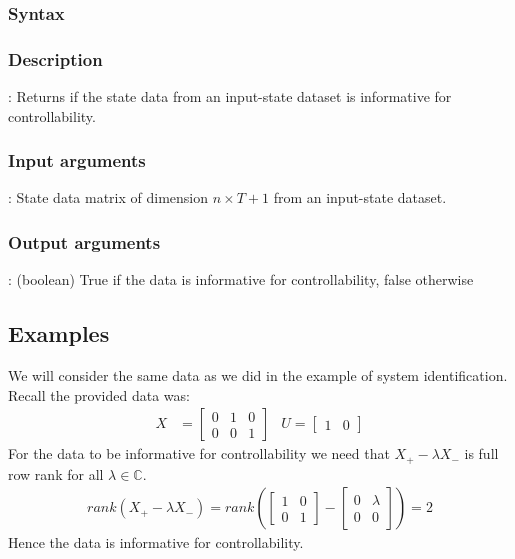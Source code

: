 \subsubsection*{Syntax}

\subsubsection*{Description}
: Returns if the state data from an input-state dataset is informative for controllability.

\subsubsection*{Input arguments}
\textbf{}: State data matrix of dimension $n \times T+1$ from an input-state dataset.

\subsubsection*{Output arguments}
\textbf{}: (boolean) True if the data is informative for controllability, false otherwise

\subsection{Examples} \label{NotIdentifyButControllable}
We will consider the same data as we did in the example of system identification. Recall the provided data was:
\begin{align*}
X &= \begin{bmatrix} 0&1&0 \\ 0&0&1 \end{bmatrix} & U = \begin{bmatrix}	1&0	\end{bmatrix}
\end{align*} 
For the data to be informative for controllability we need that $X_+ - \lambda X_-$ is full row rank for all $\lambda \in \mathbb{C}$.
\begin{align*}
rank(X_+ - \lambda X_-) = rank\left(\begin{bmatrix} 1&0\\0&1\end{bmatrix} - \begin{bmatrix} 0&\lambda\\0&0\end{bmatrix}\right) = 2
\end{align*}
Hence the data is informative for controllability. 

